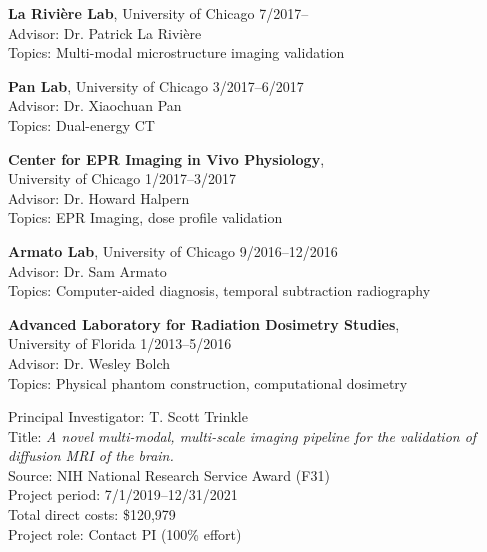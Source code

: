 \documentclass[10pt,letterpaper]{article}
\begin{document}



\begin{benumerate}{5}
\item
  {\textbf{La Rivi\`ere Lab}, University of Chicago} \hfill 7/2017--\\
  Advisor: Dr. Patrick La Rivi\`ere\\
  Topics: Multi-modal microstructure imaging validation
\item
  {\textbf{Pan Lab}, University of Chicago} \hfill 3/2017--6/2017\\
  Advisor: Dr. Xiaochuan Pan\\
  Topics: Dual-energy CT
\item
  {\textbf{Center for EPR Imaging in Vivo Physiology}, \\
    University of Chicago} \hfill 1/2017--3/2017\\
  Advisor: Dr. Howard Halpern\\
  Topics: EPR Imaging, dose profile validation
\item
  {\textbf{Armato Lab}, University of Chicago} \hfill 9/2016--12/2016\\
  Advisor: Dr. Sam Armato\\
  Topics: Computer-aided diagnosis, temporal subtraction radiography
\item
  {\textbf{Advanced Laboratory for Radiation Dosimetry Studies}, \\
    University of Florida} \hfill 1/2013--5/2016\\
  Advisor: Dr. Wesley Bolch\\
  Topics: Physical phantom construction, computational dosimetry
\end{benumerate}

\begin{benumerate}{1}
\item
  Principal Investigator: T. Scott Trinkle\\
  Title: \textit{A novel multi-modal, multi-scale imaging pipeline for the
    validation of diffusion MRI of the brain.}\\
  Source: NIH National Research Service Award (F31)\\
  Project period: 7/1/2019--12/31/2021\\
  Total direct costs: \$120,979\\
  Project role: Contact PI (100\% effort)
\end{benumerate}
\end{document}
